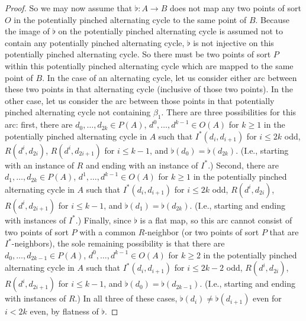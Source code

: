 \documentclass{amsart}
\theoremstyle{definition}
\theoremstyle{remark}
\numberwithin{equation}{section}
\begin{document}
\begin{proof}
    So we may now assume that $\flat: A \to B$ does not map any two points of sort $O$ in the potentially pinched alternating cycle to the same point of $B$. Because the image of $\flat$ on the potentially pinched alternating cycle is assumed not to contain any potentially pinched alternating cycle, $\flat$ is not injective on this potentially pinched alternating cycle. So there must be two points of sort $P$ within this potentially pinched alternating cycle which are mapped to the same point of $B$. In the case of an alternating cycle, let us consider either arc between these two points in that alternating cycle (inclusive of those two points).  In the other case, let us consider the arc between those points in that potentially pinched alternating cycle not containing $\beta_1$.  There are three possibilities for this arc: first, there are $d_0, \ldots, d_{2k} \in P(A)$, $d^{0}, \ldots, d^{k-1} \in O(A)$ for $k \geq 1$ in the potentially pinched alternating cycle in $A$ such that $I^{*}(d_{i}, d_{i+1})$ for $i \leq 2k$ odd, $R(d^{i}, d_{2i})$, $R(d^{i}, d_{2i+1})$ for $i \leq k-1$, and $\flat(d_0) = \flat(d_{2k})$. (I.e., starting with an instance of $R$ and ending with an instance of $I^{*}$.) Second, there are $d_1, \ldots, d_{2k} \in P(A)$, $d^{1}, \ldots, d^{k-1} \in O(A)$ for $k \geq 1$ in the potentially pinched alternating cycle in $A$ such that $I^{*}(d_{i}, d_{i+1})$ for $i \leq 2k$ odd, $R(d^{i}, d_{2i})$, $R(d^{i}, d_{2i+1})$ for $i \leq k-1$, and $\flat(d_1) = \flat(d_{2k})$. (I.e., starting and ending with instances of $I^{*}$.) Finally, since $\flat$ is a flat map, so this arc cannot consist of two points of sort $P$ with a common $R$-neighbor (or two points of sort $P$ that are $I^{*}$-neighbors), the sole remaining possibility is that there are $d_0, \ldots, d_{2k-1} \in P(A)$, $d^{0}, \ldots, d^{k-1} \in O(A)$ for $k \geq 2$ in the potentially pinched alternating cycle in $A$ such that $I^{*}(d_{i}, d_{i+1})$ for $i \leq 2k-2$ odd, $R(d^{i}, d_{2i})$, $R(d^{i}, d_{2i+1})$ for $i \leq k-1$, and $\flat(d_0) = \flat(d_{2k-1})$. (I.e., starting and ending with instances of $R$.) In all three of these cases, $\flat(d_{i}) \neq \flat(d_{i+1}) $ even for $i < 2k$ even, by flatness of $\flat$.


\end{proof}
\end{document}
